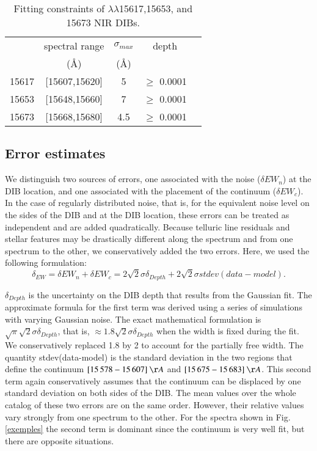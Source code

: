 \documentclass[printer]{aa} %
\begin{document}
\begin{table}[ht]
\caption{Fitting constraints of $\lambda\lambda$15617,15653,
and 15673 NIR DIBs.  }             
\label{constraint}      
\centering                          
\begin{tabular}{c c c c c}       
\hline\hline                
     & spectral range  & $ \sigma_{max} $ & depth  \\     
     & (\AA) & (\AA)&   \\    
\hline                        
15617 & [15607,15620] & 5 & $\geq$ 0.0001 \\
15653 &  [15648,15660]  & 7 & $\geq$ 0.0001 \\
15673 & [15668,15680]  & 4.5 & $\geq$ 0.0001   \\
\hline                                  
\end{tabular}
\end{table}

\subsection{Error estimates \label{error}}
We distinguish two sources of errors, one associated with the noise ($\delta EW_{n}$) at the DIB location, and one associated with the placement of the continuum ($\delta EW_{c}$). In the case of regularly distributed noise, that is, for the equivalent noise level on the sides of the DIB and at the DIB location, these errors can be treated as independent and are
added quadratically. Because telluric line residuals and stellar features may be drastically different along the spectrum and from one  spectrum to the other, we conservatively added the two errors. Here, we used the following formulation:
\begin{equation}
\label{err}
\delta_{EW} =\delta EW_{n} + \delta EW_{c} = 2 \sqrt 2 \sigma \delta_{Depth} + 2 \sqrt 2  \sigma stdev (data - model)
.\end{equation}

$\delta_{Depth}$ is the uncertainty on the DIB depth that results from the Gaussian fit. The approximate formula for the first term was derived using a series of simulations with varying Gaussian noise. The exact mathematical formulation is $\sqrt \pi \sqrt 2 \sigma \delta_{Depth}$, that is, $\approx  1.8 \sqrt 2 \sigma \delta_{Depth}$ when the width is fixed during the fit. We conservatively replaced 1.8 by 2 to account for the partially free width.  The quantity stdev(data-model) is the standard deviation in the two regions that define the continuum $ [15\,578-15\,607]\:\AA$ and $ [15\,675-15\,683]\:\AA$. This second term again conservatively assumes that the continuum can be displaced by one standard deviation on both sides of the DIB. The mean values over the whole catalog of these two errors  are on the same order. However, their relative values vary strongly from one spectrum to the other. For the spectra shown in Fig. \ref{exemples} the second term is dominant since the continuum is very well fit, but there are opposite situations.
\end{document}
